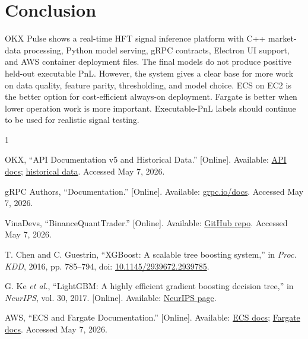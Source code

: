 \documentclass[conference]{../IEEEtran/IEEEtran}
\begin{document}
\section{Conclusion}

OKX Pulse shows a real-time HFT signal inference platform with C++ market-data processing, Python model serving, gRPC contracts, Electron UI support, and AWS container deployment files. The final models do not produce positive held-out executable PnL. However, the system gives a clear base for more work on data quality, feature parity, thresholding, and model choice. ECS on EC2 is the better option for cost-efficient always-on deployment. Fargate is better when lower operation work is more important. Executable-PnL labels should continue to be used for realistic signal testing.

\begin{thebibliography}{1}

    OKX, ``API Documentation v5 and Historical Data.'' [Online]. Available: \href{https://www.okx.com/docs-v5/en/}{API docs}; \href{https://www.okx.com/historical-data}{historical data}. Accessed May 7, 2026.

    gRPC Authors, ``Documentation.'' [Online]. Available: \href{https://grpc.io/docs/}{grpc.io/docs}. Accessed May 7, 2026.

    VinaDevs, ``BinanceQuantTrader.'' [Online]. Available: \href{https://github.com/vinadevs/BinanceQuantTrader}{GitHub repo}. Accessed May 7, 2026.

    T. Chen and C. Guestrin, ``XGBoost: A scalable tree boosting system,'' in \emph{Proc. KDD}, 2016, pp. 785--794, doi: \href{https://doi.org/10.1145/2939672.2939785}{10.1145/2939672.2939785}.

    G. Ke \emph{et al.}, ``LightGBM: A highly efficient gradient boosting decision tree,'' in \emph{NeurIPS}, vol. 30, 2017. [Online]. Available: \href{https://papers.nips.cc/paper/6907-lightgbm-a-highly-efficient-gradient-boosting-decision-tree}{NeurIPS page}.

    AWS, ``ECS and Fargate Documentation.'' [Online]. Available: \href{https://aws.amazon.com/documentation-overview/ecs/}{ECS docs}; \href{https://aws.amazon.com/documentation-overview/fargate/}{Fargate docs}. Accessed May 7, 2026.

\end{thebibliography}
\end{document}
